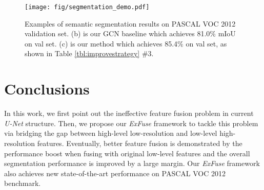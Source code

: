 \documentclass[runningheads]{llncs}
\begin{document}
\begin{figure*}
\begin{center}
\texttt{[image: fig/segmentation\_demo.pdf]}
\end{center}
   \caption{Examples of semantic segmentation results on PASCAL VOC 2012 validation set. (b) is our GCN \cite{Peng2017Large} baseline which achieves 81.0\% mIoU on val set. (c) is our method which achieves 85.4\% on val set, as shown in Table \ref{tbl:improvestrategy} \#3.
}
\label{fig:short}
\end{figure*}




\section{Conclusions}

In this work, we first point out the ineffective feature fusion problem in current \emph{U-Net} structure. Then, we propose our \emph{ExFuse} framework to tackle this problem via bridging the gap between high-level low-resolution and low-level high-resolution features. Eventually, better feature fusion is demonstrated by the performance boost when fusing with original low-level features and the overall segmentation performance is improved by a large margin. Our \emph{ExFuse} framework also achieves new state-of-the-art performance on PASCAL VOC 2012 benchmark.






\end{document}
